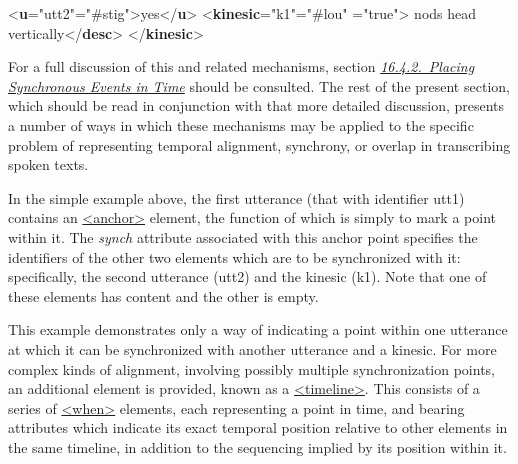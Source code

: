 \begin{shaded}
{<\textbf{u}\hspace*{1em}{xml:id}="{utt2}"\hspace*{1em}{who}="{\#stig}">}yes{</\textbf{u}>}\mbox{}\newline 
{<\textbf{kinesic}\hspace*{1em}{xml:id}="{k1}"\hspace*{1em}{who}="{\#lou}"\mbox{}\newline 
\hspace*{1em}{iterated}="{true}">}\mbox{}\newline 
{}nods head vertically{</\textbf{desc}>}\mbox{}\newline 
{</\textbf{kinesic}>}\end{shaded}\egroup\par \par
For a full discussion of this and related mechanisms, section \textit{\hyperref[SASYMP]{16.4.2.\ Placing Synchronous Events in Time}} should be consulted. The rest of the present section, which should be read in conjunction with that more detailed discussion, presents a number of ways in which these mechanisms may be applied to the specific problem of representing temporal alignment, synchrony, or overlap in transcribing spoken texts.\par
In the simple example above, the first utterance (that with identifier utt1) contains an \hyperref[TEI.anchor]{<anchor>} element, the function of which is simply to mark a point within it. The {\itshape synch} attribute associated with this anchor point specifies the identifiers of the other two elements which are to be synchronized with it: specifically, the second utterance (utt2) and the kinesic (k1). Note that one of these elements has content and the other is empty.\par
This example demonstrates only a way of indicating a point within one utterance at which it can be synchronized with another utterance and a kinesic. For more complex kinds of alignment, involving possibly multiple synchronization points, an additional element is provided, known as a \hyperref[TEI.timeline]{<timeline>}. This consists of a series of \hyperref[TEI.when]{<when>} elements, each representing a point in time, and bearing attributes which indicate its exact temporal position relative to other elements in the same timeline, in addition to the sequencing implied by its position within it.\par
